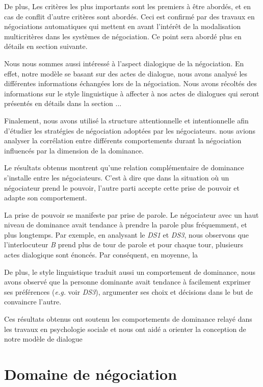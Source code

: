 		De plus, Les critères les plus importants sont les premiers à être abordés, et en cas de conflit d'autre critères sont abordés. 
		Ceci est confirmé par des travaux en négociations automatiques qui mettent en avant l'intérêt de la modalisation multicritères dans les systèmes de négociation. Ce point sera abordé plus en détails en section suivante. 
		 
		 Nous nous sommes aussi intéressé à l'aspect dialogique de la négociation. En effet, notre modèle se basant sur des actes de dialogue, nous avons analysé  les différentes informations échangées lors de la négociation. 
		 Nous avons récoltés des informations sur le style linguistique à affecter à nos actes de dialogues qui seront présentés en détails dans la section ... 
		 
		 Finalement, nous avons utilisé la structure attentionnelle et intentionnelle afin d'étudier les stratégies de négociation adoptées par les négociateurs. nous avions analyser la corrélation entre différents comportements durant la négociation influencés par la dimension de la dominance.
		 
		 Le résultats obtenus montrent qu'une relation complémentaire de dominance s'installe entre les négociateurs. C'est à dire que dans la situation où un négociateur prend le pouvoir, l'autre parti accepte cette prise de pouvoir et adapte son comportement.
	
		 La prise de pouvoir se manifeste par prise de parole. Le négociateur avec un haut niveau de dominance avait tendance à prendre la parole plus fréquemment, et plus longtemps. Par exemple, en analysant le \emph{DS1} et \emph{DS3}, nous observons que l'interlocuteur \textit{B} prend plus de tour de parole et pour chaque tour, plusieurs actes dialogique sont énoncés. Par conséquent, en moyenne, la
		 
		 
		 De plus, le style linguistique traduit aussi un comportement de dominance, nous avons observé que la personne dominante avait tendance à facilement exprimer ses préférences (\emph{e.g.} voir \emph{DS3}), argumenter ses choix et décisions dans le but de convaincre l'autre. 
		 
		Ces résultats obtenus ont soutenu les comportements de dominance relayé dans les travaux en psychologie sociale et nous ont aidé a orienter la conception de notre modèle de dialogue
		
	

\section{Domaine de négociation}
\label{domaine}

